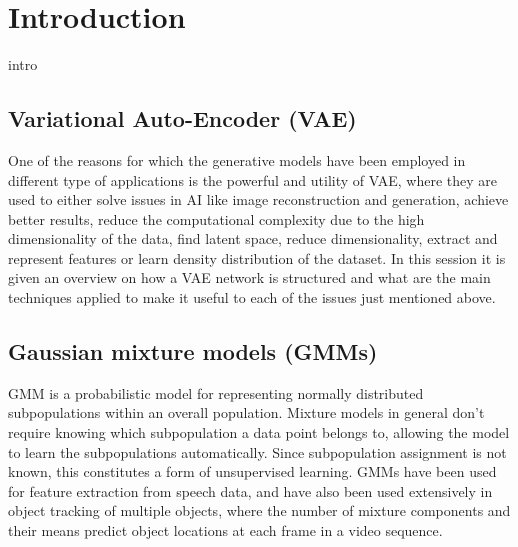 
\pagestyle{fancy}  
\chapter*{Introduction}

\vspace{5 pt}
intro
\section{Variational Auto-Encoder (VAE)}
\label{sec:}
One of the reasons for which the generative models have been employed in different type of applications is the powerful and utility of VAE, where they are used to either solve issues in AI like image reconstruction and generation, achieve better results, reduce the computational complexity due to the high dimensionality of the data, find latent space, reduce dimensionality, extract and represent features or learn density distribution of the dataset. In this session it is given an overview on how a VAE network is structured and what are the main techniques applied to make it useful to each of the issues just mentioned above.
\vspace{0.3cm}
\section{Gaussian mixture models (GMMs)}

GMM is a probabilistic model for representing normally distributed subpopulations within an overall population. Mixture models in general don't require knowing which subpopulation a data point belongs to, allowing the model to learn the subpopulations automatically. Since subpopulation assignment is not known, this constitutes a form of unsupervised learning. GMMs have been used for feature extraction from speech data, and have also been used extensively in object tracking of multiple objects, where the number of mixture components and their means predict object locations at each frame in a video sequence.



\clearpage{\pagestyle{empty}\cleardoublepage}
